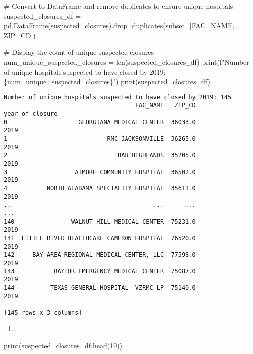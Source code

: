 \documentclass[
  letterpaper,
  DIV=11,
  numbers=noendperiod]{scrartcl}
\newenvironment{Shaded}{\begin{snugshade}}{\end{snugshade}}
\newcommand{\BuiltInTok}[1]{\textcolor[rgb]{0.00,0.23,0.31}{#1}}
\newcommand{\CommentTok}[1]{\textcolor[rgb]{0.37,0.37,0.37}{#1}}
\newcommand{\DecValTok}[1]{\textcolor[rgb]{0.68,0.00,0.00}{#1}}
\newcommand{\NormalTok}[1]{\textcolor[rgb]{0.00,0.23,0.31}{#1}}
\newcommand{\OperatorTok}[1]{\textcolor[rgb]{0.37,0.37,0.37}{#1}}
\newcommand{\SpecialCharTok}[1]{\textcolor[rgb]{0.37,0.37,0.37}{#1}}
\newcommand{\SpecialStringTok}[1]{\textcolor[rgb]{0.13,0.47,0.30}{#1}}
\newcommand{\StringTok}[1]{\textcolor[rgb]{0.13,0.47,0.30}{#1}}
\providecommand{\tightlist}{%
  \setlength{\itemsep}{0pt}\setlength{\parskip}{0pt}}\usepackage{longtable,booktabs,array}
\begin{document}
\begin{Shaded}
\begin{Highlighting}[]
\CommentTok{\# Convert to DataFrame and remove duplicates to ensure unique hospitals}
\NormalTok{suspected\_closures\_df }\OperatorTok{=}\NormalTok{ pd.DataFrame(suspected\_closures).drop\_duplicates(subset}\OperatorTok{=}\NormalTok{[}\StringTok{\textquotesingle{}FAC\_NAME\textquotesingle{}}\NormalTok{, }\StringTok{\textquotesingle{}ZIP\_CD\textquotesingle{}}\NormalTok{])}

\CommentTok{\# Display the count of unique suspected closures}
\NormalTok{num\_unique\_suspected\_closures }\OperatorTok{=} \BuiltInTok{len}\NormalTok{(suspected\_closures\_df)}
\BuiltInTok{print}\NormalTok{(}\SpecialStringTok{f"Number of unique hospitals suspected to have closed by 2019: }\SpecialCharTok{\{}\NormalTok{num\_unique\_suspected\_closures}\SpecialCharTok{\}}\SpecialStringTok{"}\NormalTok{)}
\BuiltInTok{print}\NormalTok{(suspected\_closures\_df)}
\end{Highlighting}
\end{Shaded}

\begin{verbatim}
Number of unique hospitals suspected to have closed by 2019: 145
                                     FAC_NAME   ZIP_CD  year_of_closure
0                    GEORGIANA MEDICAL CENTER  36033.0             2019
1                            RMC JACKSONVILLE  36265.0             2019
2                               UAB HIGHLANDS  35205.0             2019
3                   ATMORE COMMUNITY HOSPITAL  36502.0             2019
4           NORTH ALABAMA SPECIALITY HOSPITAL  35611.0             2019
..                                        ...      ...              ...
140                WALNUT HILL MEDICAL CENTER  75231.0             2019
141  LITTLE RIVER HEALTHCARE CAMERON HOSPITAL  76520.0             2019
142     BAY AREA REGIONAL MEDICAL CENTER, LLC  77598.0             2019
143           BAYLOR EMERGENCY MEDICAL CENTER  75087.0             2019
144          TEXAS GENERAL HOSPITAL- VZRMC LP  75140.0             2019

[145 rows x 3 columns]
\end{verbatim}

\begin{enumerate}
\def\labelenumi{\arabic{enumi}.}
\setcounter{enumi}{1}
\tightlist
\item
\end{enumerate}

\begin{Shaded}
\begin{Highlighting}[]
\BuiltInTok{print}\NormalTok{(suspected\_closures\_df.head(}\DecValTok{10}\NormalTok{))}
\end{Highlighting}
\end{Shaded}
\end{document}
